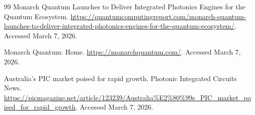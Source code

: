 \documentclass[11pt,a4paper]{article}
\begin{document}
\begin{thebibliography}{99}
 Monarch Quantum Launches to Deliver Integrated Photonics Engines for the Quantum Ecosystem. \url{https://quantumcomputingreport.com/monarch-quantum-launches-to-deliver-integrated-photonics-engines-for-the-quantum-ecosystem/}. Accessed March 7, 2026.

 Monarch Quantum: Home. \url{https://monarchquantum.com/}. Accessed March 7, 2026.

 Australia's PIC market poised for rapid growth. Photonic Integrated Circuits News. \url{https://picmagazine.net/article/123239/Australia\%E2\%80\%99s_PIC_market_poised_for_rapid_growth}. Accessed March 7, 2026.

\end{thebibliography}
\end{document}
